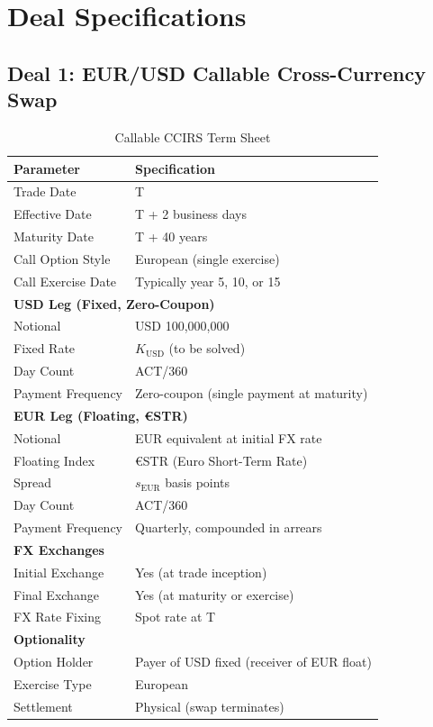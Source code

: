 \documentclass[11pt,a4paper]{article}
\theoremstyle{definition}
\begin{document}
\section{Deal Specifications}

\subsection{Deal 1: EUR/USD Callable Cross-Currency Swap}

\begin{table}[h]
\centering
\caption{Callable CCIRS Term Sheet}
\label{tab:ccirs_terms}
\begin{tabular}{ll}
\toprule
\textbf{Parameter} & \textbf{Specification} \\
\midrule
Trade Date & T \\
Effective Date & T + 2 business days \\
Maturity Date & T + 40 years \\
Call Option Style & European (single exercise) \\
Call Exercise Date & Typically year 5, 10, or 15 \\
\midrule
\multicolumn{2}{l}{\textbf{USD Leg (Fixed, Zero-Coupon)}} \\
Notional & USD 100,000,000 \\
Fixed Rate & $K_{\text{USD}}$ (to be solved) \\
Day Count & ACT/360 \\
Payment Frequency & Zero-coupon (single payment at maturity) \\
\midrule
\multicolumn{2}{l}{\textbf{EUR Leg (Floating, €STR)}} \\
Notional & EUR equivalent at initial FX rate \\
Floating Index & €STR (Euro Short-Term Rate) \\
Spread & $s_{\text{EUR}}$ basis points \\
Day Count & ACT/360 \\
Payment Frequency & Quarterly, compounded in arrears \\
\midrule
\multicolumn{2}{l}{\textbf{FX Exchanges}} \\
Initial Exchange & Yes (at trade inception) \\
Final Exchange & Yes (at maturity or exercise) \\
FX Rate Fixing & Spot rate at T \\
\midrule
\multicolumn{2}{l}{\textbf{Optionality}} \\
Option Holder & Payer of USD fixed (receiver of EUR float) \\
Exercise Type & European \\
Settlement & Physical (swap terminates) \\
\bottomrule
\end{tabular}
\end{table}
\end{document}
